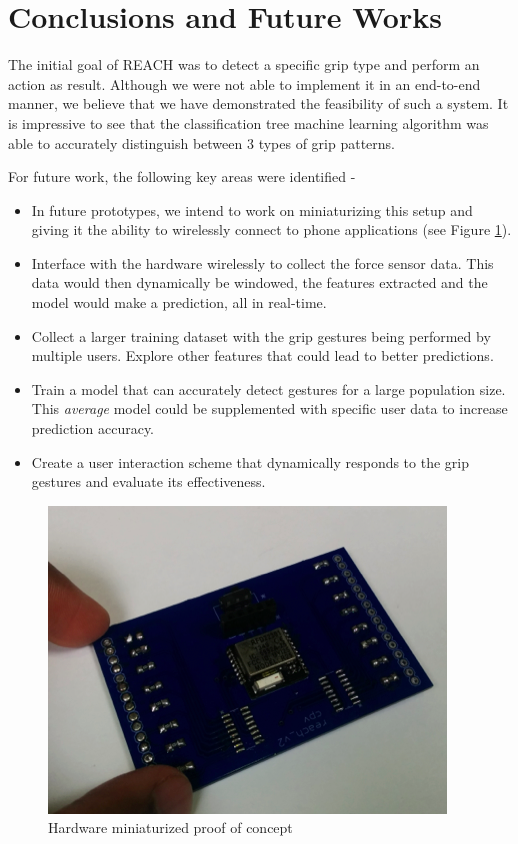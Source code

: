 \section{Conclusions and Future Works}

The initial goal of REACH was to detect a specific grip type and perform an action as result. Although we were not able to implement it in an end-to-end manner, we believe that we have demonstrated the feasibility of such a system. It is impressive to see that the classification tree machine learning algorithm was able to accurately distinguish between 3 types of grip patterns.

\par
For future work, the following key areas were identified - 
\begin{itemize}
  \item In future prototypes, we intend to work on miniaturizing this setup and giving it the ability to wirelessly connect to phone applications (see Figure \ref{fig:hardware_mini}).
  
  \item Interface with the hardware wirelessly to collect the force sensor data. This data would then dynamically be windowed, the features extracted and the model would make a prediction, all in real-time.
  
  \item Collect a larger training dataset with the grip gestures being performed by multiple users. Explore other features that could lead to better predictions.
  
  \item Train a model that can accurately detect gestures for a large population size. This \textit{average} model could be supplemented with specific user data to increase prediction accuracy. 
  
  \item Create a user interaction scheme that dynamically responds to the grip gestures and evaluate its effectiveness.

\end{itemize}

\begin{figure}[h]
\includegraphics[width=.45\textwidth]{hardware_mini.png}
\caption{Hardware miniaturized proof of concept}
\label{fig:hardware_mini}
\end{figure}
